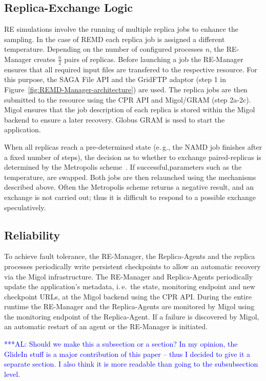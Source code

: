 \documentclass{rspublic}
\newcommand{\alnote}[1]{ {\textcolor{blue} { ***AL: #1 }}}
\newcommand{\alnote}[1]{}
\newcommand{\remanager}[1]{RE-Manager }
\begin{document}
\subsection{Replica-Exchange Logic}
                                            
RE simulations involve the running of multiple replica jobs to enhance the sampling. 
In the case of REMD each replica job is assigned a different temperature.  
Depending on the number of configured processes $n$, the \remanager\
creates $\frac{n}{2}$ pairs of replicas.
Before launching a job the \remanager\ ensures that all required input 
files are transfered to the respective resource. For this purpose, the SAGA File API and the
GridFTP adaptor (step 1 in Figure~\ref{fig:REMD-Manager-architecture})
are used.  The replica jobs are then submitted to the resource
using the CPR API and Migol/GRAM (step 2a-2c). Migol ensures that the
job description of each replica is stored within the Migol backend
to ensure a later recovery. Globus GRAM is used to start the
application.

When all replicas reach a pre-determined state (e.\,g., the NAMD job finishes 
after a fixed number of steps), the decision as to whether to exchange
paired-replicas is determined by the Metropolis scheme~\cite{metropolis:1087}. 
If successful,parameters such as the temperature, are swapped. Both jobs are then
relaunched using the mechanisms described above. Often the Metropolis
scheme returns a negative result, and an exchange is not carried out;
thus it is difficult to respond to a possible exchange speculatively. 


\subsection{Reliability}
To achieve fault tolerance, the RE-Manager, the Replica-Agents and the
replica processes periodically write persistent checkpoints to allow
an automatic recovery via the Migol infrastructure. The \remanager\
and Replica-Agents periodically update the application's metadata,
i.\,e.\ the state, monitoring endpoint and new checkpoint URLs, at the
Migol backend using the CPR API. During the entire runtime the
\remanager\ and the Replica-Agents are monitored by Migol using the
monitoring endpoint of the Replica-Agent. If a failure is discovered
by Migol, an automatic restart of an agent or the RE-Manager is
initiated.

\alnote{Should we make this a subsection or a section? In my opinion,
the GlideIn stuff is a major contribution of this paper -- thus I decided to
give it a separate section. I also think it is more readable than going to the
subsubsection level.}           
\end{document}
